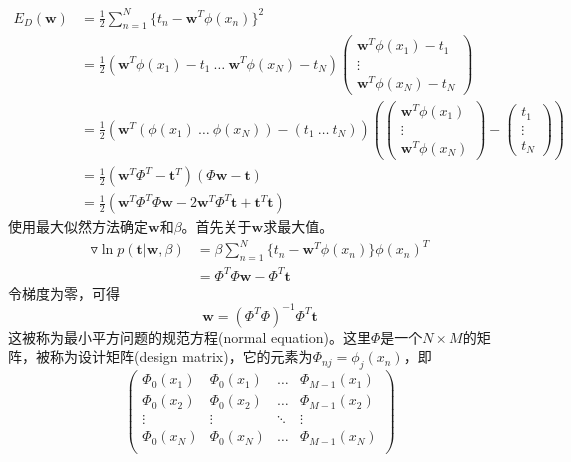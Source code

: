\begin{equation}
\begin{aligned}
	E_D(\boldsymbol{w})&=\frac{1}{2}\sum_{n=1}^{N}\{t_n-\boldsymbol{w}^T\phi(x_n) \}^2\\
	&=\frac{1}{2}(\boldsymbol{w}^T\phi(x_1)-t_1\ \dots \ \boldsymbol{w}^T\phi(x_N)-t_N)
	\begin{pmatrix}
	\boldsymbol{w}^T\phi(x_1)-t_1\\
	\vdots\\
	\boldsymbol{w}^T\phi(x_N)-t_N
	\end{pmatrix}\\
	&=\frac{1}{2}(\boldsymbol{w}^T(\phi(x_1)\ \dots \ \phi(x_N))-(t_1\ \dots \ t_N))\left(
	\begin{pmatrix}
	\boldsymbol{w}^T\phi(x_1)\\
	\vdots\\
	\boldsymbol{w}^T\phi(x_N)
	\end{pmatrix}-
	\begin{pmatrix}
	t_1\\\vdots\\t_N
	\end{pmatrix}
	\right)\\
	&=\frac{1}{2}(\boldsymbol{w}^T\Phi^T-\boldsymbol{t}^T)(\Phi \boldsymbol{w} - \boldsymbol{t})\\
	&=\frac{1}{2}(\boldsymbol{w}^T\Phi^T\Phi \boldsymbol{w}-2\boldsymbol{w}^T\Phi^T\boldsymbol{t}+\boldsymbol{t}^T\boldsymbol{t})
\end{aligned}
\end{equation}
使用最大似然方法确定$\boldsymbol{w}$和$\beta$。首先关于$\boldsymbol{w}$求最大值。
\begin{equation}
\begin{aligned}
	\triangledown \ln p(\boldsymbol{t}|\boldsymbol{w},\beta)&=\beta\sum_{n=1}^{N}\{t_n-\boldsymbol{w}^T\phi(x_n) \}\phi(x_n)^T\\
	&=\Phi^T\Phi\boldsymbol{w}-\Phi^T\boldsymbol{t}
	\end{aligned}
\end{equation}
令梯度为零，可得
\begin{equation}
	\boldsymbol{w}=(\Phi^T\Phi)^{-1}\Phi^T\boldsymbol{t}
\end{equation}
这被称为最小平方问题的规范方程(normal equation)。这里$\Phi$是一个$N\times M$的矩阵，被称为设计矩阵(design matrix)，它的元素为$\Phi_{nj}=\phi_j(x_n)$，即
\begin{equation}
	\begin{pmatrix}
	\Phi_0(x_1)&\Phi_0(x_1)&\dots&\Phi_{M-1}(x_1)\\
	\Phi_0(x_2)&\Phi_0(x_2)&\dots&\Phi_{M-1}(x_2)\\
	\vdots &\vdots &\ddots &\vdots\\
	\Phi_0(x_N)&\Phi_0(x_N)&\dots&\Phi_{M-1}(x_N)\\
	\end{pmatrix}
\end{equation}
